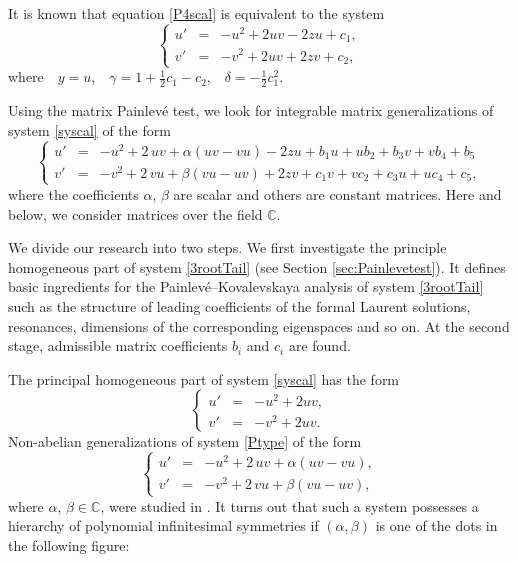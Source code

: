 \documentclass{article}
\theoremstyle{plain}
\newcommand{\PPainleve}{Painlev{\'e}}
\begin{document}
It is known that equation \eqref{P4scal} is equivalent to the system
\begin{equation} \label{syscal}
\left\{
\begin{array}{lcl}
u' &=& -u^2 + 2 u v - 2 z u + c_1 , 
\\[2mm]
v' &=& -v^2 + 2 u v + 2 z v + c_2,
\end{array}
\right.
\end{equation}
where \,\, $y=u$, \,\, $\gamma=1 + \frac{1}{2} c_1 - c_2$, \,\, $\delta = - \frac{1}{2} c_1^2$. 

Using the matrix Painlev\'e test, we look for integrable matrix generalizations of system \eqref{syscal} of the form 
\begin{equation}\label{3rootTail}
\left\{
\begin{array}{lcl}
u' &=&  - u^2 + 2 \,u v  + \alpha (u v - v u) - 2 z u + b_1 u+u b_2+b_3 v+v b_4+b_5
\\ [2mm]
v' &=& -  v^2 + 2 \, v u + \beta (v u - u v) + 2 z v+c_1 v+v c_2 +c_3 u +u c_4+c_5,
\end{array}   
\right.
\end{equation}
where the coefficients $\alpha$, $\beta$ are scalar and others are constant matrices. Here and below, we consider matrices over the field $\mathbb{C}$.

We divide our research into two steps. We first investigate the principle homogeneous part of system \eqref{3rootTail} (see Section \ref{sec:Painlevetest}). It defines basic ingredients for the \PPainleve--Kovalevskaya analysis of system \eqref{3rootTail} such as the structure of leading coefficients of the formal Laurent solutions, resonances, dimensions of the corresponding eigenspaces and so on. At the second stage, admissible matrix coefficients $b_i$ and $c_i$ are found.

The principal homogeneous part of system \eqref{syscal} has the form 
\begin{equation}\label{Ptype}
\left\{
\begin{array}{lcl}
u' &=& -u^2 + 2 u v, \\[2mm]
v' &=& -v^2 + 2 u v.
\end{array}
\right.
\end{equation}
Non-abelian generalizations of system \eqref{Ptype} of the form
\begin{equation}\label{3rootN}
\left\{
\begin{array}{lcl}
u' &=&  - u^2 + 2 \,u v  + \alpha (u v - v u),
\\ [2mm]
v' &=& -  v^2 + 2 \, v u + \beta (v u - u v),
\end{array}   
\right.
\end{equation}
where $\alpha$, $\beta \in {\mathbb C}$, were studied in \cite{SW2}. It turns out that such a system possesses a hierarchy of polynomial infinitesimal symmetries if $(\alpha, \beta)$ is one of the dots 
 in the following figure:
\end{document}
